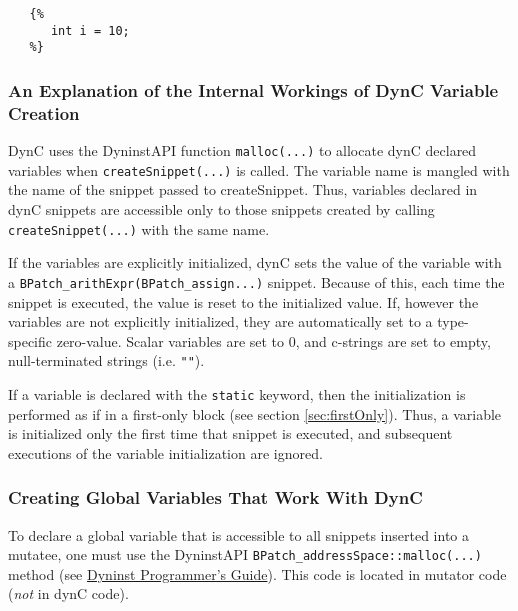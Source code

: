 \documentclass{article}
\begin{document}
\begin{lstlisting}
   {%
      int i = 10;
   %}
\end{lstlisting}

\subsubsection{An Explanation of the Internal Workings of DynC Variable Creation}
\label{sec:varExplain}
DynC uses the DyninstAPI function \verb!malloc(...)! to allocate dynC declared variables when \verb!createSnippet(...)! is called. The variable name is mangled with the name of the snippet passed to createSnippet. Thus, variables declared in dynC snippets are accessible only to those snippets created by calling \verb!createSnippet(...)! with the same name. 

If the variables are explicitly initialized, dynC sets the value of the variable with a \verb!BPatch_arithExpr(BPatch_assign...)! snippet. Because of this, each time the snippet is executed, the value is reset to the initialized value. If, however the variables are not explicitly initialized, they are automatically set to a type-specific zero-value. Scalar variables are set to 0, and c-strings are set to empty, null-terminated strings (i.e. \verb!""!).

If a variable is declared with the \verb!static! keyword, then the initialization is performed as if in a first-only block (see section \ref{sec:firstOnly}). Thus, a variable is initialized only the first time that snippet is executed, and subsequent executions of the variable initialization are ignored. 

\subsubsection{Creating Global Variables That Work With DynC}
To declare a global variable that is accessible to all snippets inserted into a mutatee, one must use the DyninstAPI \hspace{1pt} \verb!BPatch_addressSpace::malloc(...)! method (see \underline{Dyninst Programmer's Guide}). This code is located in mutator code (\emph{not} in dynC code).
\end{document}

